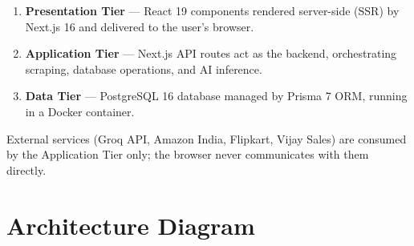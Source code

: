 \documentclass[12pt,a4paper]{report}
\begin{document}
\begin{enumerate}[noitemsep]
  \item \textbf{Presentation Tier} --- React 19 components rendered server-side
        (SSR) by Next.js 16 and delivered to the user's browser.
  \item \textbf{Application Tier} --- Next.js API routes act as the backend,
        orchestrating scraping, database operations, and AI inference.
  \item \textbf{Data Tier} --- PostgreSQL 16 database managed by Prisma 7 ORM,
        running in a Docker container.
\end{enumerate}

External services (Groq API, Amazon India, Flipkart, Vijay Sales) are consumed
by the Application Tier only; the browser never communicates with them directly.

\section{Architecture Diagram}
\end{document}
